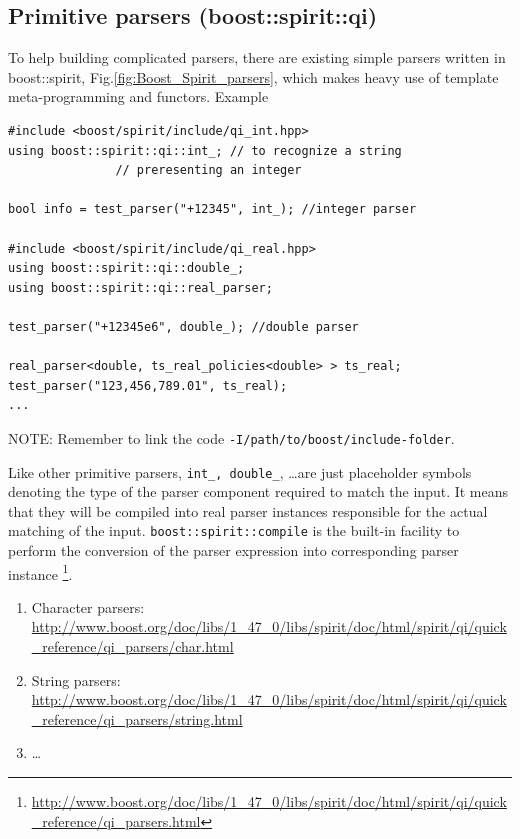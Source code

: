 \subsection{Primitive parsers (boost::spirit::qi)}
\label{sec:primitive_parsers}

To help building complicated parsers, there are existing simple parsers written
in boost::spirit, Fig.\ref{fig:Boost_Spirit_parsers}, which makes heavy use of
template meta-programming and functors. Example
\begin{lstlisting}
#include <boost/spirit/include/qi_int.hpp>
using boost::spirit::qi::int_; // to recognize a string 
               // preresenting an integer

bool info = test_parser("+12345", int_); //integer parser

#include <boost/spirit/include/qi_real.hpp>
using boost::spirit::qi::double_;
using boost::spirit::qi::real_parser;

test_parser("+12345e6", double_); //double parser

real_parser<double, ts_real_policies<double> > ts_real;
test_parser("123,456,789.01", ts_real);
...
\end{lstlisting}
NOTE: Remember to link the code \verb!-I/path/to/boost/include-folder!.

Like other primitive parsers, \verb!int_, double_!, \ldots are just placeholder
symbols denoting the type of the parser component required to match the input. It means that they will be
compiled into real parser instances responsible for the actual matching of the
input. \verb!boost::spirit::compile! is the built-in facility to perform the
conversion of the parser expression into corresponding parser instance
\footnote{\url{http://www.boost.org/doc/libs/1_47_0/libs/spirit/doc/html/spirit/qi/quick_reference/qi_parsers.html}}.

\begin{enumerate}
  \item Character parsers:
  \url{http://www.boost.org/doc/libs/1_47_0/libs/spirit/doc/html/spirit/qi/quick_reference/qi_parsers/char.html}
  
  \item String parsers:
  \url{http://www.boost.org/doc/libs/1_47_0/libs/spirit/doc/html/spirit/qi/quick_reference/qi_parsers/string.html}
  
  \item \ldots
\end{enumerate}


